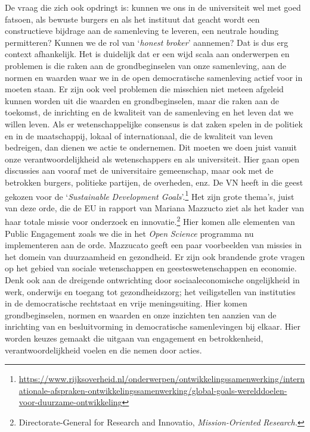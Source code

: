\documentclass[smallauthor, chapterhaspagenum, nochapterinheader, pagenuminheader,  bigchapnum,medium2, tocpages, garamond, titleinheader]{jote-book}
\begin{document}
	De vraag die zich ook opdringt is: kunnen we ons in de universiteit wel met goed fatsoen, als bewuste burgers en als het instituut dat geacht wordt een constructieve bijdrage aan de samenleving te leveren, een neutrale houding permitteren? Kunnen we de rol van ‘\emph{honest}\emph{ broker}' aannemen? Dat is dus erg context afhankelijk. Het is duidelijk dat er een wijd scala aan onderwerpen en problemen is die raken aan de grondbeginselen van onze samenleving, aan de normen en waarden waar we in de open democratische samenleving actief voor in moeten staan. Er zijn ook veel problemen die misschien niet meteen afgeleid kunnen worden uit die waarden en grondbeginselen, maar die raken aan de toekomst, de inrichting en de kwaliteit van de samenleving en het leven dat we willen leven. Als er wetenschappelijke consensus is dat zaken spelen in de politiek en in de maatschappij, lokaal of internationaal, die de kwaliteit van leven bedreigen, dan dienen we actie te ondernemen. Dit moeten we doen juist vanuit onze verantwoordelijkheid als wetenschappers en als universiteit. Hier gaan open discussies aan vooraf met de universitaire gemeenschap, maar ook met de betrokken burgers, politieke partijen, de overheden, enz. De VN heeft in die geest gekozen voor de ‘\emph{Sustainable}\emph{ Development Goals}'.\footnote{\href{https://www.rijksoverheid.nl/onderwerpen/ontwikkelingssamenwerking/internationale-afspraken-ontwikkelingssamenwerking/global-goals-werelddoelen-voor-duurzame-ontwikkeling}{https://www.rijksoverheid.nl/onderwerpen/ontwikkelingssamenwerking/internationale-afspraken-ontwikkelingssamenwerking/global-goals-werelddoelen-voor-duurzame-ontwikkeling}} Het zijn grote thema's, juist van deze orde, die de EU in rapport van Mariana Mazzucto ziet als het kader van haar totale missie voor onderzoek en innovatie.\footnote{Directorate-General for Research and Innovatio, \emph{Mission-}\emph{Oriented}\emph{ Research}\emph{.}} Hier komen alle elementen van Public Engagement zoals we die in het \emph{Open }\emph{Science} programma nu implementeren aan de orde. Mazzucato geeft een paar voorbeelden van missies in het domein van duurzaamheid en gezondheid. Er zijn ook brandende grote vragen op het gebied van sociale wetenschappen en geesteswetenschappen en economie. Denk ook aan de dreigende ontwrichting door sociaaleconomische ongelijkheid in werk, onderwijs en toegang tot gezondheidszorg; het veiligstellen van instituties in de democratische rechtstaat en vrije meningsuiting. Hier komen grondbeginselen, normen en waarden en onze inzichten ten aanzien van de inrichting van en besluitvorming in democratische samenlevingen bij elkaar. Hier worden keuzes gemaakt die uitgaan van engagement en betrokkenheid, verantwoordelijkheid voelen en die nemen door acties.
\end{document}
